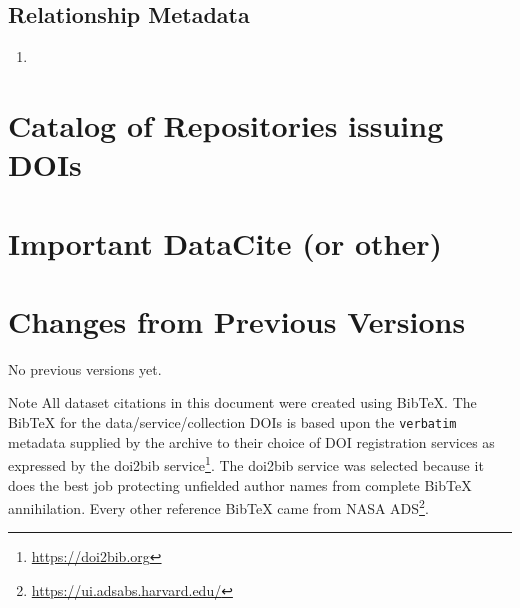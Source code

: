 \documentclass[11pt,a4paper]{ivoa}
\begin{document}
\subsection{Relationship Metadata}
\begin{enumerate}
\item 
\end{enumerate}


\appendix
\section{Catalog of Repositories issuing DOIs}

\section{Important DataCite (or other) }
\section{Changes from Previous Versions}

No previous versions yet.

\begin{admonition}{Note}
All dataset citations in this document were created using BibTeX. The BibTeX for the data/service/collection DOIs is based upon the \texttt{verbatim} metadata supplied by the archive to their choice of DOI registration services as expressed by the doi2bib service\footnote{\url{https://doi2bib.org}}. The doi2bib service was selected because it does the best job protecting unfielded author names from complete BibTeX annihilation.
Every other reference BibTeX came from NASA ADS\footnote{\url{https://ui.adsabs.harvard.edu/}}.
\end{admonition}


\end{document}
